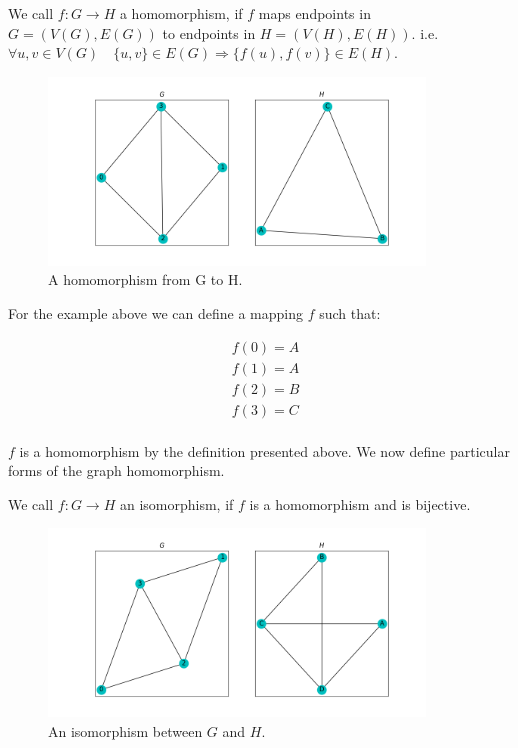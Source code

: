 \begin{dfn}
We call $f: G \rightarrow H$ a homomorphism,
 if $f$ maps endpoints in $G=(V(G),E(G))$ to endpoints in $H=(V(H),E(H))$. i.e. $ \forall u,v \in V(G) \quad \{u,v\} \in E(G) \Rightarrow \{f(u),
f(v)\} \in E(H)$.
\end{dfn}

\begin{figure}[h!]
    \includegraphics[width=10cm]{Images/graph_homomorphism.png}
    \centering
    \caption{A homomorphism from G to H.}
\end{figure}

For the example above we can define a mapping $f$ such that:

\begin{align*}
    &f(0) = A\\
    &f(1) = A\\
    &f(2) = B\\
    &f(3) = C\\ 
\end{align*}

$f$ is a homomorphism by the definition presented above. 
We now define particular forms of the graph homomorphism.

\begin{dfn}
    We call $f: G \rightarrow H$ an isomorphism,
 if $f$ is a homomorphism and is bijective.
\end{dfn}

\begin{figure}[h!]
    \includegraphics[width=10cm]{Images/graph_isomoprhism.png}
    \centering
    \caption{An isomorphism between $G$ and $H$.}
\end{figure}


